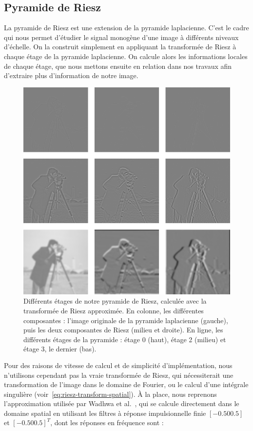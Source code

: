 \subsection{Pyramide de Riesz}

La pyramide de Riesz est une extension de la pyramide laplacienne. C'est le cadre qui nous permet d'étudier le signal monogène d'une image à différents niveaux d'échelle. On la construit simplement en appliquant la transformée de Riesz à chaque étage de la pyramide laplacienne. On calcule alors les informations locales de chaque étage, que nous mettons ensuite en relation dans nos travaux afin d'extraire plus d'information de notre image.

\begin{figure}
    \centering
    \includegraphics[width=.65\textwidth]{contenu/resources/images/riesz_pyramid_cameraman}
    \caption[Pyramide de Riesz]{Différents étages de notre pyramide de Riesz, calculée avec la transformée de Riesz approximée. En colonne, les différentes composantes : l'image originale de la pyramide laplacienne (gauche), puis les deux composantes de Riesz (milieu et droite). En ligne, les différents étages de la pyramide : étage 0 (haut), étage 2 (milieu) et étage 3, le dernier (bas).}
    \label{fig:riesz-pyramid-cameraman}
\end{figure}

Pour des raisons de vitesse de calcul et de simplicité d'implémentation, nous n'utilisons cependant pas la vraie transformée de Riesz, qui nécessiterait une transformation de l'image dans le domaine de Fourier, ou le calcul d'une intégrale singulière (voir~\ref{eq:riesz-transform-spatial}). À la place, nous reprenons l'approximation utilisée par Wadhwa et al.~\cite{wadhwa_riesz_2014}, qui se calcule directement dans le domaine spatial en utilisant les filtres à réponse impulsionnelle finie $[-0.5 0 0.5]$ et $[-0.5 0 0.5]^T$, dont les réponses en fréquence sont :

